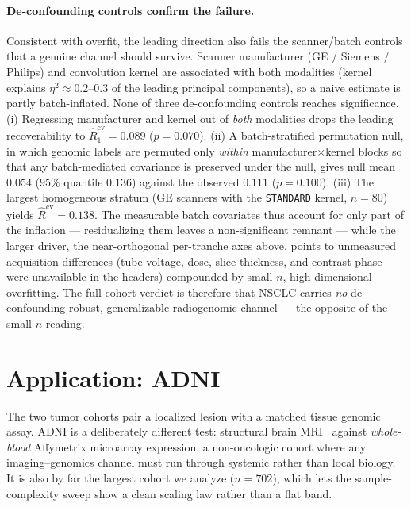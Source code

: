 \documentclass{article}
\begin{document}
\paragraph{De-confounding controls confirm the failure.}
Consistent with overfit, the leading direction also fails the scanner/batch
controls that a genuine channel should survive. Scanner manufacturer
(GE / Siemens / Philips) and convolution kernel are associated with both
modalities (kernel explains $\eta^2 \approx 0.2$--$0.3$ of the leading principal
components), so a naive estimate is partly batch-inflated. None of three
de-confounding controls reaches significance. (i) Regressing manufacturer and
kernel out of \emph{both} modalities drops the leading recoverability to
$\hat R_1^{\mathrm{cv}} = 0.089$ ($p = 0.070$). (ii) A batch-stratified
permutation null, in which genomic labels are permuted only \emph{within}
manufacturer$\times$kernel blocks so that any batch-mediated covariance is
preserved under the null, gives null mean $0.054$ ($95\%$ quantile $0.136$)
against the observed $0.111$ ($p = 0.100$). (iii) The largest homogeneous
stratum (GE scanners with the \texttt{STANDARD} kernel, $n = 80$) yields
$\hat R_1^{\mathrm{cv}} = 0.138$. The measurable batch covariates thus account
for only part of the inflation --- residualizing them leaves a non-significant
remnant --- while the larger driver, the near-orthogonal per-tranche axes above,
points to unmeasured acquisition differences (tube voltage, dose, slice
thickness, and contrast phase were unavailable in the headers) compounded by
small-$n$, high-dimensional overfitting. The full-cohort verdict is therefore
that NSCLC carries \emph{no} de-confounding-robust, generalizable radiogenomic
channel --- the opposite of the small-$n$ reading.

\section{Application: ADNI}
\label{sec:adni}

The two tumor cohorts pair a localized lesion with a matched tissue genomic
assay. ADNI is a deliberately different test: structural brain
MRI~\citep{petersen2010adni} against \emph{whole-blood} Affymetrix microarray
expression, a non-oncologic cohort where any imaging--genomics channel must run
through systemic rather than local biology. It is also by far the largest
cohort we analyze ($n = 702$), which lets the sample-complexity sweep show a
clean scaling law rather than a flat band.
\end{document}
